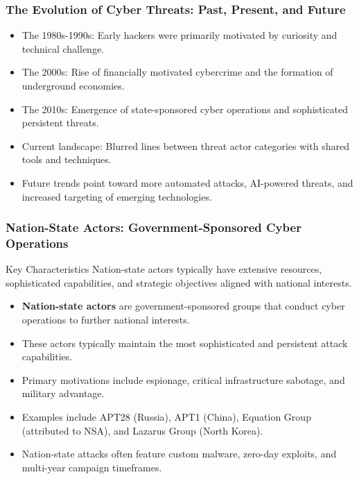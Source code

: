 \documentclass{beamer}
\begin{document}
\begin{frame}
    \frametitle{The Evolution of Cyber Threats: Past, Present, and Future}
    
    \begin{itemize}
        \item The 1980s-1990s: Early hackers were primarily motivated by curiosity and technical challenge.
        \item The 2000s: Rise of financially motivated cybercrime and the formation of underground economies.
        \item The 2010s: Emergence of state-sponsored cyber operations and sophisticated persistent threats.
        \item Current landscape: Blurred lines between threat actor categories with shared tools and techniques.
        \item Future trends point toward more automated attacks, AI-powered threats, and increased targeting of emerging technologies.
    \end{itemize}
\end{frame}

\begin{frame}
    \frametitle{Nation-State Actors: Government-Sponsored Cyber Operations}
    
    \begin{block}{Key Characteristics}
        Nation-state actors typically have extensive resources, sophisticated capabilities, and strategic objectives aligned with national interests.
    \end{block}
    
    \begin{itemize}
        \item \textbf{Nation-state actors} are government-sponsored groups that conduct cyber operations to further national interests.
        \item These actors typically maintain the most sophisticated and persistent attack capabilities.
        \item Primary motivations include espionage, critical infrastructure sabotage, and military advantage.
        \item Examples include APT28 (Russia), APT1 (China), Equation Group (attributed to NSA), and Lazarus Group (North Korea).
        \item Nation-state attacks often feature custom malware, zero-day exploits, and multi-year campaign timeframes.
    \end{itemize}
\end{frame}
\end{document}

